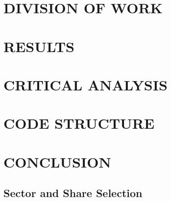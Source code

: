 \documentclass[10pt,twocolumn]{witseiepaper}
\begin{document}

\section{DIVISION OF WORK}

\section{RESULTS}\label{results}

\section{CRITICAL ANALYSIS}

\section{CODE STRUCTURE}

\section{CONCLUSION}


%



\newpage

\begin{appendix}
	
\section{Sector and Share Selection}


\end{appendix}

\end{document}
